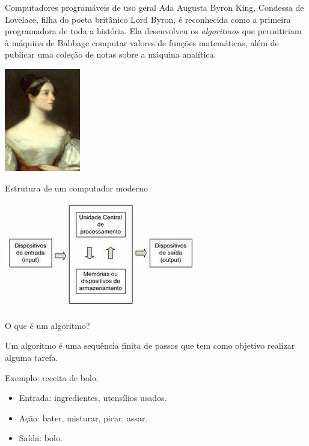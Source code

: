 \documentclass[hyperref={pdfpagelabels=false}]{beamer}
\begin{document}
\begin{frame}{Computadores programáveis de uso geral}
  Ada Augusta Byron King, Condessa de Lovelace, filha do poeta britânico Lord Byron, é reconhecida como a primeira programadora de toda a história. Ela desenvolveu os \emph{algoritmos} que permitiriam à máquina de Babbage computar valores de funções matemáticas, além de publicar uma coleção de notas sobre a máquina analítica.
	\begin{center}
		\includegraphics[height=4.5cm]{img/ada.jpeg}
	\end{center}
\end{frame}

\begin{frame}{Estrutura de um computador moderno}
  \begin{center}
    \includegraphics{img/cpu.jpg}
  \end{center}
\end{frame}

\begin{frame}{O que é um algoritmo?}
   \begin{center}
      Um algoritmo é uma sequência \alert{finita} de passos que tem como objetivo realizar alguma tarefa.
   \end{center}

	Exemplo: receita de bolo.
   \begin{itemize}
		\item Entrada: ingredientes, utensílios usados.
		\item Ação: bater, misturar, picar, assar.
		\item Saída: bolo.
	\end{itemize}
\end{frame}
\end{document}

